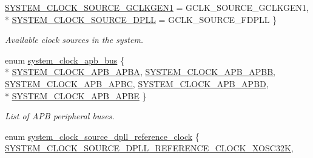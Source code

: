 \begin{DoxyCompactItemize}
\hyperlink{group__asfdoc__sam0__system__clock__group_gga86882dc960f2552722e9713da97fcc58ab873ebe5b9dd823cb794be31ef0fc1ef}{S\+Y\+S\+T\+E\+M\+\_\+\+C\+L\+O\+C\+K\+\_\+\+S\+O\+U\+R\+C\+E\+\_\+\+G\+C\+L\+K\+G\+E\+N1} = G\+C\+L\+K\+\_\+\+S\+O\+U\+R\+C\+E\+\_\+\+G\+C\+L\+K\+G\+E\+N1, 
\\*
\hyperlink{group__asfdoc__sam0__system__clock__group_gga86882dc960f2552722e9713da97fcc58a2b8b452464b43d7f2ef752ff3cee7c99}{S\+Y\+S\+T\+E\+M\+\_\+\+C\+L\+O\+C\+K\+\_\+\+S\+O\+U\+R\+C\+E\+\_\+\+D\+P\+L\+L} = G\+C\+L\+K\+\_\+\+S\+O\+U\+R\+C\+E\+\_\+\+F\+D\+P\+L\+L
 \}
\begin{DoxyCompactList}\small\item\em Available clock sources in the system. \end{DoxyCompactList}\item 
enum \hyperlink{group__asfdoc__sam0__system__clock__group_gac4ca1e52df2ab46c663dc51b51f9f2d5}{system\+\_\+clock\+\_\+apb\+\_\+bus} \{ \\*
\hyperlink{group__asfdoc__sam0__system__clock__group_ggac4ca1e52df2ab46c663dc51b51f9f2d5a25197a2c1efe6a444a5cdcef7d82a1de}{S\+Y\+S\+T\+E\+M\+\_\+\+C\+L\+O\+C\+K\+\_\+\+A\+P\+B\+\_\+\+A\+P\+B\+A}, 
\hyperlink{group__asfdoc__sam0__system__clock__group_ggac4ca1e52df2ab46c663dc51b51f9f2d5aa94daeca3198d35ba50839f69fa97fb2}{S\+Y\+S\+T\+E\+M\+\_\+\+C\+L\+O\+C\+K\+\_\+\+A\+P\+B\+\_\+\+A\+P\+B\+B}, 
\hyperlink{group__asfdoc__sam0__system__clock__group_ggac4ca1e52df2ab46c663dc51b51f9f2d5a53168b7d478e1634594203d1ec2a654a}{S\+Y\+S\+T\+E\+M\+\_\+\+C\+L\+O\+C\+K\+\_\+\+A\+P\+B\+\_\+\+A\+P\+B\+C}, 
\hyperlink{group__asfdoc__sam0__system__clock__group_ggac4ca1e52df2ab46c663dc51b51f9f2d5ae1c985a40aa020c1a824b3b5b626c97d}{S\+Y\+S\+T\+E\+M\+\_\+\+C\+L\+O\+C\+K\+\_\+\+A\+P\+B\+\_\+\+A\+P\+B\+D}, 
\\*
\hyperlink{group__asfdoc__sam0__system__clock__group_ggac4ca1e52df2ab46c663dc51b51f9f2d5ab5ecb95438c032f301cdff15db7cf495}{S\+Y\+S\+T\+E\+M\+\_\+\+C\+L\+O\+C\+K\+\_\+\+A\+P\+B\+\_\+\+A\+P\+B\+E}
 \}
\begin{DoxyCompactList}\small\item\em List of A\+P\+B peripheral buses. \end{DoxyCompactList}\item 
enum \hyperlink{group__asfdoc__sam0__system__clock__group_ga835d71d0dc4437429d00c63226803630}{system\+\_\+clock\+\_\+source\+\_\+dpll\+\_\+reference\+\_\+clock} \{ \hyperlink{group__asfdoc__sam0__system__clock__group_gga835d71d0dc4437429d00c63226803630a8f52f2c9e2c9c3f6e570ab4f30a00e7b}{S\+Y\+S\+T\+E\+M\+\_\+\+C\+L\+O\+C\+K\+\_\+\+S\+O\+U\+R\+C\+E\+\_\+\+D\+P\+L\+L\+\_\+\+R\+E\+F\+E\+R\+E\+N\+C\+E\+\_\+\+C\+L\+O\+C\+K\+\_\+\+X\+O\+S\+C32\+K}, 

\end{DoxyCompactItemize}
